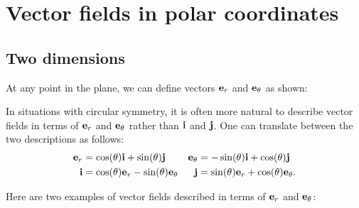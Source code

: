 \documentclass[reqno]{amsart}
\theoremstyle{definition}
\begin{document}
\section{Vector fields in polar coordinates}
\label{sec-polar-fields}

\subsection{Two dimensions}
\label{subsec-polar-fields-two}

At any point in the plane, we can define vectors $\mathbf{e}_r$ and
$\mathbf{e}_\theta$ as shown: 
\begin{center}
\end{center}
In situations with circular symmetry, it is often more natural to
describe vector fields in terms of $\mathbf{e}_r$ and $\mathbf{e}_\theta$ rather than
$\mathbf{i}$ and $\mathbf{j}$.  One can translate between the two descriptions as
follows: 
\begin{align*}
 \mathbf{e}_r &= \cos(\theta)\mathbf{i} + \sin(\theta)\mathbf{j} & 
 \mathbf{e}_\theta &= -\sin(\theta)\mathbf{i} + \cos(\theta)\mathbf{j} \\
 \mathbf{i} &= \cos(\theta)\mathbf{e}_r -\sin(\theta)\mathbf{e}_\theta &
 \mathbf{j} &= \sin(\theta)\mathbf{e}_r +\cos(\theta)\mathbf{e}_\theta.
\end{align*}

Here are two examples of vector fields described in terms of $\mathbf{e}_r$
and $\mathbf{e}_\theta$: \par
\end{document}
